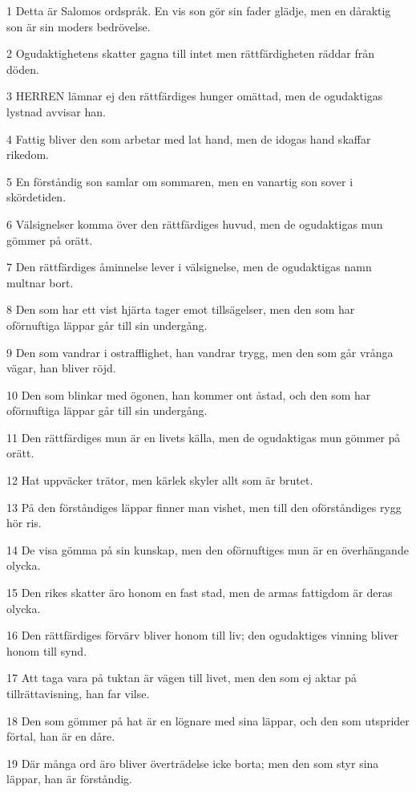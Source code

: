\par 1 Detta är Salomos ordspråk. En vis son gör sin fader glädje, men en dåraktig son är sin moders bedrövelse.
\par 2 Ogudaktighetens skatter gagna till intet men rättfärdigheten räddar från döden.
\par 3 HERREN lämnar ej den rättfärdiges hunger omättad, men de ogudaktigas lystnad avvisar han.
\par 4 Fattig bliver den som arbetar med lat hand, men de idogas hand skaffar rikedom.
\par 5 En förståndig son samlar om sommaren, men en vanartig son sover i skördetiden.
\par 6 Välsignelser komma över den rättfärdiges huvud, men de ogudaktigas mun gömmer på orätt.
\par 7 Den rättfärdiges åminnelse lever i välsignelse, men de ogudaktigas namn multnar bort.
\par 8 Den som har ett vist hjärta tager emot tillsägelser, men den som har oförnuftiga läppar går till sin undergång.
\par 9 Den som vandrar i ostrafflighet, han vandrar trygg, men den som går vrånga vägar, han bliver röjd.
\par 10 Den som blinkar med ögonen, han kommer ont åstad, och den som har oförnuftiga läppar går till sin undergång.
\par 11 Den rättfärdiges mun är en livets källa, men de ogudaktigas mun gömmer på orätt.
\par 12 Hat uppväcker trätor, men kärlek skyler allt som är brutet.
\par 13 På den förståndiges läppar finner man vishet, men till den oförståndiges rygg hör ris.
\par 14 De visa gömma på sin kunskap, men den oförnuftiges mun är en överhängande olycka.
\par 15 Den rikes skatter äro honom en fast stad, men de armas fattigdom är deras olycka.
\par 16 Den rättfärdiges förvärv bliver honom till liv; den ogudaktiges vinning bliver honom till synd.
\par 17 Att taga vara på tuktan är vägen till livet, men den som ej aktar på tillrättavisning, han far vilse.
\par 18 Den som gömmer på hat är en lögnare med sina läppar, och den som utsprider förtal, han är en dåre.
\par 19 Där många ord äro bliver överträdelse icke borta; men den som styr sina läppar, han är förståndig.
